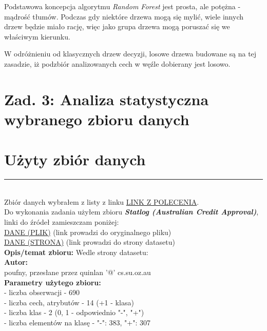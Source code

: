 \documentclass[a4paper,12pt]{article}
\newcommand{\linia}{\rule{\linewidth}{0.5pt}}
\theoremstyle{mytheor}
\begin{document}
Podstawowa koncepcja algorytmu \emph{Random Forest} jest prosta, ale potężna - mądrość tłumów. Podczas gdy niektóre drzewa mogą się mylić, wiele innych drzew będzie miało rację, więc jako grupa drzewa mogą poruszać się we właściwym kierunku.

W odróżnieniu od klasycznych drzew decyzji, losowe drzewa budowane są na tej zasadzie, iż podzbiór analizowanych cech w węźle dobierany jest losowo.

\section*{Zad. 3: Analiza statystyczna wybranego zbioru danych}

\section*{Użyty zbiór danych}
\linia\\
Zbiór danych wybrałem z listy z linku \textcolor{red}{\href{https://archive.ics.uci.edu/ml/datasets.php?format=&task=cla&att=&area=&numAtt=&numIns=&type=&sort=nameUp&view=table}{LINK Z POLECENIA}}.\\

Do wykonania zadania użyłem zbioru \textbf{\emph{Statlog (Australian Credit Approval)}}, linki do źródeł zamieszczam poniżej:\\
\textcolor{red}{\href{https://archive.ics.uci.edu/ml/machine-learning-databases/statlog/australian/australian.dat}{DANE (PLIK)}} (link prowadzi do oryginalnego pliku)\\
\textcolor{red}{\href{https://archive.ics.uci.edu/ml/datasets/Statlog+\%28Australian+Credit+Approval\%29}{DANE (STRONA)}} (link prowadzi do strony datasetu)\\

\textbf{Opis/temat zbioru:} Wedle strony datasetu: \\

\textbf{Autor:}\\
poufny, przesłane przez quinlan '@' cs.su.oz.au\\

\textbf{Parametry użytego zbioru:}\\
 - liczba obserwacji - 690\\
 - liczba cech, atrybutów - 14 (+1 - klasa)\\
 - liczba klas - 2 (0, 1 - odpowiednio "-", "+")\\
 - liczba elementów na klasę - "-": 383, "+": 307\\
\end{document}
